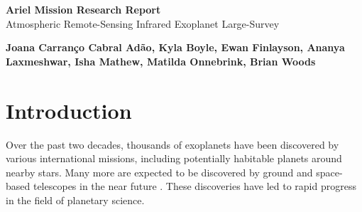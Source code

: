 \documentclass[12pt]{article}
\begin{document}
\begin{center}
    {\Large \textbf{Ariel Mission Research Report}}\\

    \vspace{.4cm}
    {\large Atmospheric Remote-Sensing Infrared Exoplanet Large-Survey}\\

    \vspace{1cm}
    \begin{minipage}{.8\textwidth}
        \centering
        \small
        \textbf{Joana Carranço Cabral Adão, Kyla Boyle, Ewan Finlayson, Ananya Laxmeshwar, Isha Mathew, Matilda Onnebrink, Brian Woods}
    \end{minipage}
    \vspace{2.3cm}

    \begin{abstract}

    Ariel, the Atmospheric Remote-sensing Infrared Exoplanet Large-survey, is a mission that's part of ESA's Cosmic Vision program due to launch in 2029 and aimed at studying the chemical composition and thermal structures of exoplanet atmospheres.
    Using infrared spectroscopy, Ariel is set to observe thousands exoplanets with focus on those hotter than 600 K in close orbits around their stars. By analysing their atmospheric makeup, including key chemical compositions,
    Ariel will help scientists better understand the diversity of exoplanet environments, providing crucial insights into planetary formation and evolution.
    Ariel will be the first mission dedicated to this task, paving the way for future missions that will expand our knowledge of exoplanets, including potentially habitable worlds.

    \end{abstract}
\end{center}

\newpage


\setcounter{page}{1}
\section{Introduction} \label{sec:1}

Over the past two decades, thousands of exoplanets have been discovered by various international missions, including potentially habitable planets around nearby stars.
Many more are expected to be discovered by ground and space-based telescopes in the near future \cite{madhusudhan2019exoplanetary}.
These discoveries have led to rapid progress in the field of planetary science.
\end{document}
